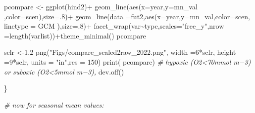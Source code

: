 \documentclass[
]{article}
\newenvironment{Shaded}{\begin{snugshade}}{\end{snugshade}}
\newcommand{\AttributeTok}[1]{\textcolor[rgb]{0.77,0.63,0.00}{#1}}
\newcommand{\CommentTok}[1]{\textcolor[rgb]{0.56,0.35,0.01}{\textit{#1}}}
\newcommand{\DecValTok}[1]{\textcolor[rgb]{0.00,0.00,0.81}{#1}}
\newcommand{\FloatTok}[1]{\textcolor[rgb]{0.00,0.00,0.81}{#1}}
\newcommand{\FunctionTok}[1]{\textcolor[rgb]{0.00,0.00,0.00}{#1}}
\newcommand{\NormalTok}[1]{#1}
\newcommand{\OtherTok}[1]{\textcolor[rgb]{0.56,0.35,0.01}{#1}}
\newcommand{\SpecialCharTok}[1]{\textcolor[rgb]{0.00,0.00,0.00}{#1}}
\newcommand{\StringTok}[1]{\textcolor[rgb]{0.31,0.60,0.02}{#1}}
\begin{document}
\begin{Shaded}
\begin{Highlighting}[]
\NormalTok{          pcompare }\OtherTok{\textless{}{-}} \FunctionTok{ggplot}\NormalTok{(hind2)}\SpecialCharTok{+}
           \FunctionTok{geom\_line}\NormalTok{(}\FunctionTok{aes}\NormalTok{(}\AttributeTok{x=}\NormalTok{year,}\AttributeTok{y=}\NormalTok{mn\_val ,}\AttributeTok{color=}\NormalTok{scen),}\AttributeTok{size=}\NormalTok{.}\DecValTok{8}\NormalTok{)}\SpecialCharTok{+}
           \FunctionTok{geom\_line}\NormalTok{(}\AttributeTok{data =}\NormalTok{fut2,}\FunctionTok{aes}\NormalTok{(}\AttributeTok{x=}\NormalTok{year,}\AttributeTok{y=}\NormalTok{mn\_val,}\AttributeTok{color=}\NormalTok{scen, }\AttributeTok{linetype =}\NormalTok{ GCM ),}\AttributeTok{size=}\NormalTok{.}\DecValTok{8}\NormalTok{)}\SpecialCharTok{+}
           \FunctionTok{facet\_wrap}\NormalTok{(var}\SpecialCharTok{\textasciitilde{}}\NormalTok{type,}\AttributeTok{scales=}\StringTok{"free\_y"}\NormalTok{,}\AttributeTok{nrow =}\FunctionTok{length}\NormalTok{(varlist))}\SpecialCharTok{+}\FunctionTok{theme\_minimal}\NormalTok{()}
\NormalTok{          pcompare}
          
\NormalTok{          sclr }\OtherTok{\textless{}{-}}\FloatTok{1.2}
          \FunctionTok{png}\NormalTok{(}\StringTok{"Figs/compare\_scaled2raw\_2022.png"}\NormalTok{, }
              \AttributeTok{width =}\DecValTok{6}\SpecialCharTok{*}\NormalTok{sclr, }\AttributeTok{height =}\DecValTok{9}\SpecialCharTok{*}\NormalTok{sclr, }\AttributeTok{units =} \StringTok{"in"}\NormalTok{,}\AttributeTok{res =} \DecValTok{150}\NormalTok{)}
          \FunctionTok{print}\NormalTok{( pcompare)  }\CommentTok{\# hypoxic (O2\textless{}70mmol m−3) or suboxic (O2\textless{}5mmol m−3),}
          \FunctionTok{dev.off}\NormalTok{()}
      
          
\NormalTok{       \}}
       
      \CommentTok{\# now for seasonal mean values:}
       

\end{Highlighting}
\end{Shaded}
\end{document}

